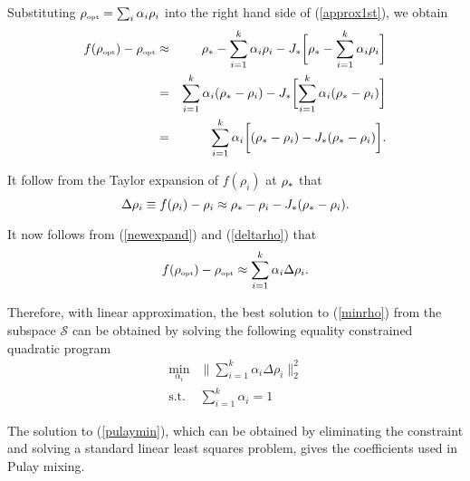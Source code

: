 \documentclass[11pt]{book}
\newcommand{\rhostar} {\rho_{\tiny \ast}}
\newcommand{\rhoopt} {\rho_{\tiny \mbox{opt}}}
\begin{document}
Substituting $\rhoopt = \sum_i \alpha_i \rho_i$ into the right hand side of 
(\ref{approx1st}), we obtain
\begin{eqnarray}
f(\rhoopt) - \rhoopt &\approx& \rhostar - \sum_{i=1}^k\alpha_i \rho_i
-J_{\ast}\biggl[ \rhostar - \sum_{i=1}^k \alpha_i\rho_i \biggr] \nonumber\\
&=& \sum_{i=1}^k\alpha_i (\rhostar - \rho_i) - J_{\ast} 
\biggl[\sum_{i=1}^k \alpha_i (\rhostar-\rho_i) \biggr] \nonumber \\
&=& \sum_{i=1}^k \alpha_i \biggl[
(\rhostar - \rho_i) - J_{\ast} (\rhostar - \rho_i)
\biggr].
\label{newexpand}
\end{eqnarray}

It follow from the Taylor expansion of $f(\rho_i)$ at $\rhostar$ that
\begin{equation}
\Delta \rho_i \equiv f(\rho_i) - \rho_i 
\approx \rhostar - \rho_i - J_{\ast}(\rhostar - \rho_i).
\label{deltarho}
\end{equation}

It now follows from (\ref{newexpand}) and (\ref{deltarho}) that
\begin{equation}
f(\rhoopt) - \rhoopt \approx \sum_{i=1}^k \alpha_i \Delta \rho_i. \label{mixing}
\end{equation}

Therefore, with linear approximation, the best solution to (\ref{minrho})
from the subspace ${\mathcal S}$
can be obtained by solving the following equality constrained quadratic
program
\begin{equation}
\begin{array}{cc}
\min_{\alpha_i} & \| \sum_{i=1}^k \alpha_i \Delta \rho_i \|_2^2 \\
\mbox{s.t.}     &  \sum_{i=1}^k \alpha_i = 1
\end{array}
\label{pulaymin}
\end{equation}

The solution to (\ref{pulaymin}), which can be obtained by eliminating the
constraint and solving a standard linear least squares problem, gives the coefficients used in Pulay mixing.
\end{document}

